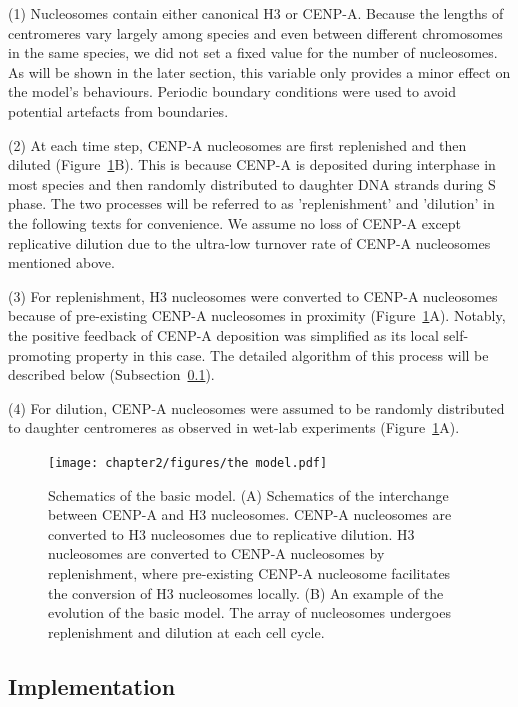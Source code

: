 (1) Nucleosomes contain either canonical H3 or CENP-A. Because the lengths of centromeres vary largely among species and even between different chromosomes in the same species, we did not set a fixed value for the number of nucleosomes. As will be shown in the later section, this variable only provides a minor effect on the model's behaviours. Periodic boundary conditions were used to avoid potential artefacts from boundaries. 

(2) At each time step, CENP-A nucleosomes are first replenished and then diluted (Figure~\ref{fig:basicmodelschematics}B). This is because CENP-A is deposited during interphase in most species and then randomly distributed to daughter DNA strands during S phase. The two processes will be referred to as 'replenishment' and 'dilution' in the following texts for convenience. We assume no loss of CENP-A except replicative dilution due to the ultra-low turnover rate of CENP-A nucleosomes mentioned above. 

(3) For replenishment, H3 nucleosomes were converted to CENP-A nucleosomes because of pre-existing CENP-A nucleosomes in proximity (Figure~\ref{fig:basicmodelschematics}A). Notably, the positive feedback of CENP-A deposition was simplified as its local self-promoting property in this case. The detailed algorithm of this process will be described below (Subsection~\ref{implementation}). 

(4) For dilution, CENP-A nucleosomes were assumed to be randomly distributed to daughter centromeres as observed in wet-lab experiments (Figure~\ref{fig:basicmodelschematics}A). 

\begin{figure}[htbp]
  \centering
  \texttt{[image: chapter2/figures/the model.pdf]}
  \caption[Schematics of the basic model]{Schematics of the basic model. (A) Schematics of the interchange between CENP-A and H3 nucleosomes. CENP-A nucleosomes are converted to H3 nucleosomes due to replicative dilution. H3 nucleosomes are converted to CENP-A nucleosomes by replenishment, where pre-existing CENP-A nucleosome facilitates the conversion of H3 nucleosomes locally. (B) An example of the evolution of the basic model. The array of nucleosomes undergoes replenishment and dilution at each cell cycle. }
  \label{fig:basicmodelschematics}
\end{figure}


\subsection{Implementation}
\label{implementation}

